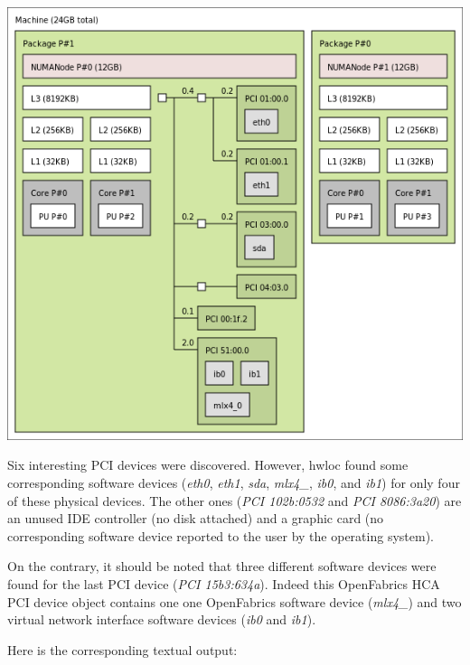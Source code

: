  
\begin{DoxyImageNoCaption}
  \mbox{\includegraphics[width=\textwidth]{devel09-pci.png}}
\end{DoxyImageNoCaption}


Six interesting P\+CI devices were discovered. However, hwloc found some corresponding software devices ({\itshape eth0}, {\itshape eth1}, {\itshape sda}, {\itshape mlx4\+\_}, {\itshape ib0}, and {\itshape ib1}) for only four of these physical devices. The other ones ({\itshape P\+CI 102b\+:0532} and {\itshape P\+CI 8086\+:3a20}) are an unused I\+DE controller (no disk attached) and a graphic card (no corresponding software device reported to the user by the operating system).

On the contrary, it should be noted that three different software devices were found for the last P\+CI device ({\itshape P\+CI 15b3\+:634a}). Indeed this Open\+Fabrics H\+CA P\+CI device object contains one one Open\+Fabrics software device ({\itshape mlx4\+\_}) and two virtual network interface software devices ({\itshape ib0} and {\itshape ib1}).

Here is the corresponding textual output\+:

 